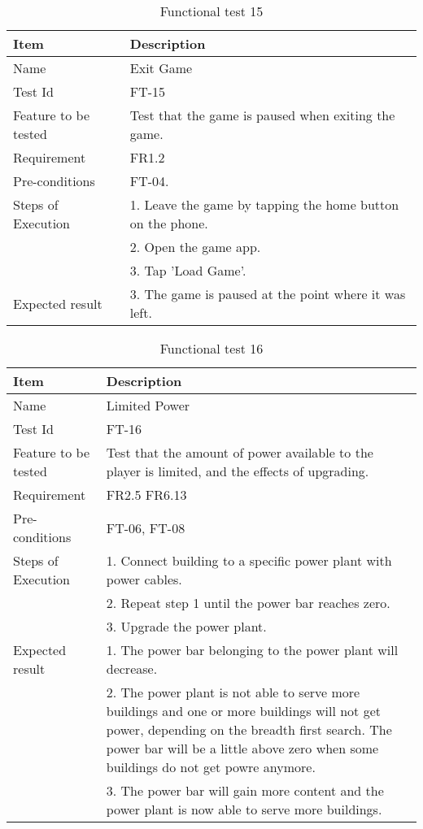 \begin{table}[H]
\centering
	\begin{tabular}{ l | p{8cm} }
		\hline
		{\bf Item} & {\bf Description} \\ \hline
		Name & Exit Game \\ 
		Test Id & FT-15 \\ 
		Feature to be tested & Test that the game is paused when exiting the game. \\ 
		Requirement & FR1.2 \\ 
		Pre-conditions & FT-04. \\ 
		Steps of Execution & 1. Leave the game by tapping the home button on the phone. \\
		& 2. Open the game app. \\
		& 3. Tap 'Load Game'. \\
		Expected result & 3. The game is paused at the point where it was left. \\  
	\end{tabular}
	\caption{Functional test 15}
\end{table}

\begin{table}[H]
\centering
	\begin{tabular}{ l | p{8cm} }
		\hline
		{\bf Item} & {\bf Description} \\ \hline
		Name & Limited Power \\ 
		Test Id & FT-16 \\ 
		Feature to be tested & Test that the amount of power available to the player is limited, and the effects of upgrading. \\ 
		Requirement & FR2.5 FR6.13 \\ 
		Pre-conditions & FT-06, FT-08 \\ 
		Steps of Execution & 1. Connect building to a specific power plant with power cables. \\
		& 2. Repeat step 1 until the power bar reaches zero. \\
		& 3. Upgrade the power plant. \\
		Expected result & 1. The power bar belonging to the power plant will decrease. \\
		& 2. The power plant is not able to serve more buildings and one or more buildings will not get power, depending on the breadth first search. The power bar will be a little above zero when some buildings do not get powre anymore. \\ 
		& 3. The power bar will gain more content and the power plant is now able to serve more buildings. \\
	\end{tabular}
	\caption{Functional test 16}
\end{table}

